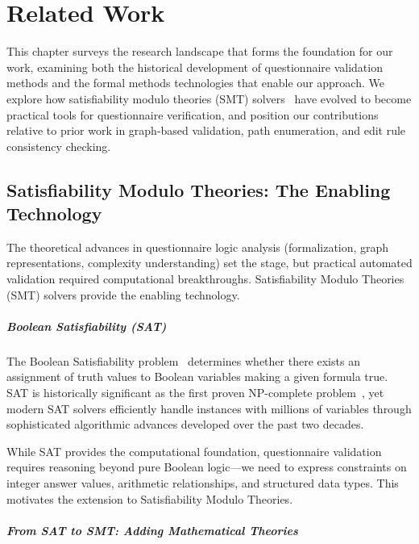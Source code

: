 \chapter{Related Work}
\label{ch:related-work}

This chapter surveys the research landscape that forms the foundation for our work, examining both the historical development of questionnaire validation methods and the formal methods technologies that enable our approach. We explore how satisfiability modulo theories (SMT) solvers~\cite{barrett2011cvc4,demoura2008z3} have evolved to become practical tools for questionnaire verification, and position our contributions relative to prior work in graph-based validation, path enumeration, and edit rule consistency checking.

\section{Satisfiability Modulo Theories: The Enabling Technology}

The theoretical advances in questionnaire logic analysis (formalization, graph representations, complexity understanding) set the stage, but practical automated validation required computational breakthroughs. Satisfiability Modulo Theories (SMT) solvers provide the enabling technology.

\paragraph{Boolean Satisfiability (SAT)}

The Boolean Satisfiability problem~\cite{biere2009handbook} determines whether there exists an assignment of truth values to Boolean variables making a given formula true. SAT is historically significant as the first proven NP-complete problem~\cite{russell2010artificial}, yet modern SAT solvers efficiently handle instances with millions of variables through sophisticated algorithmic advances developed over the past two decades.

While SAT provides the computational foundation, questionnaire validation requires reasoning beyond pure Boolean logic—we need to express constraints on integer answer values, arithmetic relationships, and structured data types. This motivates the extension to Satisfiability Modulo Theories.

\paragraph{From SAT to SMT: Adding Mathematical Theories}

